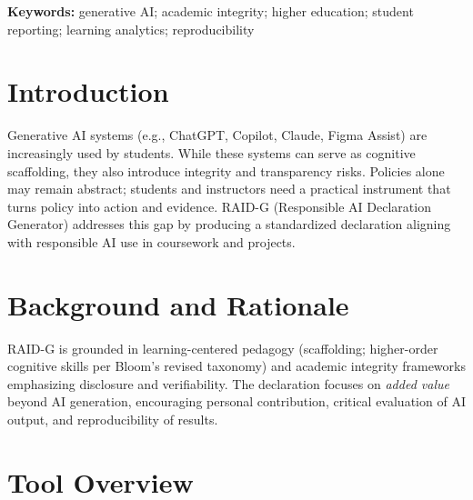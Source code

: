 \documentclass[11pt,a4paper]{article}
\title{\titlelong}
\author{\authorname\\\small \affil}
\date{2025}
\newcommand{\toolname}{RAID-G (Responsible AI Declaration Generator)}
\begin{document}
\maketitle

\begin{abstract}
\toolname{} is a web-based educational instrument that enables higher education students to generate structured \emph{Declarations of AI Use} consistent with institutional policies on responsible use of generative AI. The tool operationalizes transparency, academic integrity, and reproducibility by guiding students to document: (1) tools used, (2) purpose and scope, (3) personal contributions beyond AI, (4) validation methods, and (5) critical reflection on limitations and risks. RAID-G includes a full mode (six sections) and a light checklist mode for minor tasks. The generator runs client-side and exports Markdown for integration with repositories and assessment workflows.
\end{abstract}

\noindent\textbf{Keywords:} generative AI; academic integrity; higher education; student reporting; learning analytics; reproducibility

\section{Introduction}
Generative AI systems (e.g., ChatGPT, Copilot, Claude, Figma Assist) are increasingly used by students. While these systems can serve as cognitive scaffolding, they also introduce integrity and transparency risks. Policies alone may remain abstract; students and instructors need a practical instrument that turns policy into action and evidence. \toolname{} addresses this gap by producing a standardized declaration aligning with responsible AI use in coursework and projects.

\section{Background and Rationale}
RAID-G is grounded in learning-centered pedagogy (scaffolding; higher-order cognitive skills per Bloom’s revised taxonomy) and academic integrity frameworks emphasizing disclosure and verifiability. The declaration focuses on \emph{added value} beyond AI generation, encouraging personal contribution, critical evaluation of AI output, and reproducibility of results.

\section{Tool Overview}
\end{document}
